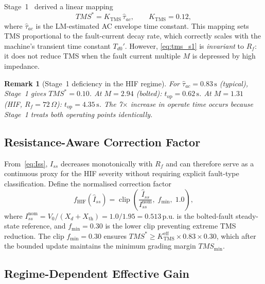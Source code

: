\documentclass[10pt,journal,twoside]{IEEEtran}
\newtheorem{remark}{Remark}
\newcommand{\pu}{\,\text{p.u.}}
\newcommand{\sss}{\,\text{s}}
\newcommand{\Rf}{R_{\!f}}
\newcommand{\tms}{TMS}
\newcommand{\tmss}{TMS^*}
\newcommand{\Iss}{\hat{I}_{ss}}
\newcommand{\tauac}{\hat{\tau}_{ac}}
\newcommand{\fhif}{f_{\mathrm{HIF}}}
\begin{document}
Stage~1~\cite{Eluvathingal2025_TR01} derived a linear mapping
\begin{equation}
\tmss = K_{\mathrm{TMS}}\,\tauac, \qquad K_{\mathrm{TMS}} = 0.12,
\label{eq:tms_s1}
\end{equation}
where $\tauac$ is the LM-estimated AC envelope time constant.  This mapping
sets TMS proportional to the fault-current decay rate, which correctly
scales with the machine's transient time constant $T_{d0}'$.  However,
\eqref{eq:tms_s1} is \emph{invariant} to $\Rf$: it does not reduce TMS
when the fault current multiple $M$ is depressed by high impedance.

\begin{remark}[Stage~1 deficiency in the HIF regime]
For $\tauac = 0.83\sss$ (typical), Stage~1 gives $\tmss = 0.10$.
At $M = 2.94$ (bolted): $t_{\mathrm{op}} = 0.62\sss$.
At $M = 1.31$ (HIF, $\Rf = 72\,\Omega$): $t_{\mathrm{op}} = 4.35\sss$.
The 7$\times$ increase in operate time occurs because Stage~1 treats
both operating points identically.
\end{remark}

\subsection{Resistance-Aware Correction Factor}
\label{sec:tmslaw:factor}

From~\eqref{eq:Iss}, $I_{ss}$ decreases monotonically with $\Rf$
and can therefore serve as a continuous proxy for the HIF severity
without requiring explicit fault-type classification.
Define the normalised correction factor
\begin{equation}
\fhif(\Iss) = \operatorname{clip}\!\left(
  \frac{\Iss}{I_{ss}^{\mathrm{nom}}},\; f_{\min},\; 1.0\right),
\label{eq:fhif}
\end{equation}
where $I_{ss}^{\mathrm{nom}} = V_0/(X_d + X_{\mathrm{th}}) = 1.0/1.95 = 0.513\pu$
is the bolted-fault steady-state reference, and $f_{\min} = 0.30$ is the
lower clip preventing extreme TMS reduction.  The clip $f_{\min} = 0.30$
ensures $\tmss \geq K_{\mathrm{TMS}}^{\mathrm{eff}} \times 0.83 \times 0.30$,
which after the bounded update maintains the minimum grading margin
$\tms_{\min}$.

\subsection{Regime-Dependent Effective Gain}
\label{sec:tmslaw:gain}
\end{document}
